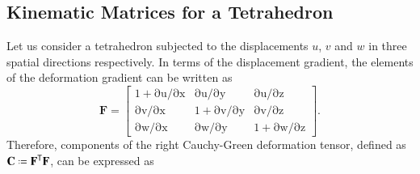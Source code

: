 \subsection{Kinematic Matrices for a Tetrahedron}

Let us consider a tetrahedron subjected to the displacements $u$, $v$ and $w$ in three spatial directions respectively. In terms of the displacement gradient, the elements of the deformation gradient can be written as
\begin{equation}
\mathbf{F} =  
\begin{bmatrix}
1 + \mathrm{\partial u / \partial x} & \mathrm{\partial u / \partial y} & \mathrm{\partial u / \partial z} \\
\mathrm{\partial v / \partial x} & 1 + \mathrm{\partial v / \partial y} & \mathrm{\partial v / \partial z} \\
\mathrm{\partial w / \partial x} & \mathrm{\partial w / \partial y} & 1 + \mathrm{\partial w / \partial z}
\end{bmatrix} .
\end{equation}	
Therefore, components of the right Cauchy-Green deformation tensor, defined as $\mathbf{C} \defeq \mathbf{F}^\mathsf{T}\mathbf{F}$, can be expressed as
